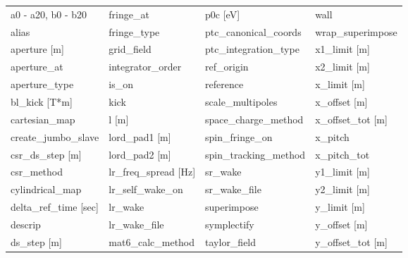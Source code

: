  \begin{tabular}{llll} \toprule
a0 - a20, b0 - b20               & fringe_at                        & p0c [eV]                         & wall                             \\
alias                            & fringe_type                      & ptc_canonical_coords             & wrap_superimpose                 \\
aperture [m]                     & grid_field                       & ptc_integration_type             & x1_limit [m]                     \\
aperture_at                      & integrator_order                 & ref_origin                       & x2_limit [m]                     \\
aperture_type                    & is_on                            & reference                        & x_limit [m]                      \\
bl_kick [T*m]                    & kick                             & scale_multipoles                 & x_offset [m]                     \\
cartesian_map                    & l [m]                            & space_charge_method              & x_offset_tot [m]                 \\
create_jumbo_slave               & lord_pad1 [m]                    & spin_fringe_on                   & x_pitch                          \\
csr_ds_step [m]                  & lord_pad2 [m]                    & spin_tracking_method             & x_pitch_tot                      \\
csr_method                       & lr_freq_spread [Hz]              & sr_wake                          & y1_limit [m]                     \\
cylindrical_map                  & lr_self_wake_on                  & sr_wake_file                     & y2_limit [m]                     \\
delta_ref_time [sec]             & lr_wake                          & superimpose                      & y_limit [m]                      \\
descrip                          & lr_wake_file                     & symplectify                      & y_offset [m]                     \\
ds_step [m]                      & mat6_calc_method                 & taylor_field                     & y_offset_tot [m]                 \\

\end{tabular}
